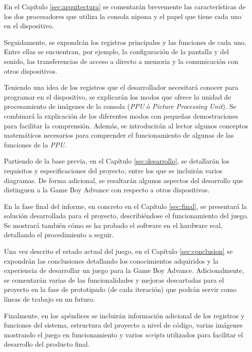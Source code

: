 En el Capítulo \ref{sec:arquitectura} se comentarán brevemente las características de los dos procesadores que utiliza la consola nipona y el papel que tiene cada uno en el dispositivo.

Seguidamente, se expondrán los registros principales y las funciones de cada uno. Entre ellas se encuentran, por ejemplo, la configuración de la pantalla y del sonido, las transferencias de acceso a directo a memoria y la comunicación con otros dispositivos.

Teniendo una idea de los registros que el desarrollador necesitará conocer para programar en el dispositivo, se explicarán los modos que ofrece la unidad de procesamiento de imágenes de la consola (\textit{PPU} ó \textit{Picture Processing Unit}). Se combinará la explicación de los diferentes modos con pequeñas demostraciones para facilitar la comprensión. Además, se introducirán al lector algunos conceptos matemáticos necesarios para comprender el funcionamiento de algunas de las funciones de la \textit{PPU}.

Partiendo de la base previa, en el Capítulo \ref{sec:desarrollo}, se detallarán los requisitos y especificaciones del proyecto, entre los que se incluirán varios diagramas. De forma adicional, se resaltarán algunos aspectos del desarrollo que distinguen a la Game Boy Advance con respecto a otros dispositivos.

En la fase final del informe, en concreto en el Capítulo \ref{sec:final}, se presentará la solución desarrollada para el proyecto, describiéndose el funcionamiento del juego. Se mostrará también cómo se ha probado el software en el hardware real, detallando el procedimiento a seguir.

Una vez descrito el estado actual del juego, en el Capítulo \ref{sec:conclusion} se expondrán las conclusiones detallando los conocimientos adquiridos y la experiencia de desarrollar un juego para la Game Boy Advance. Adicionalmente, se comentarán varias de las funcionalidades y mejoras descartadas para el proyecto en la fase de prototipado (de cada iteración) que podrán servir como líneas de trabajo en un futuro.

Finalmente, en los apéndices se incluirán información adicional de los registros y funciones del sistema, estructura del proyecto a nivel de código, varias imágenes mostrando el juego en funcionamiento y varios \textit{scripts} utilizados para facilitar el desarrollo del producto final.
